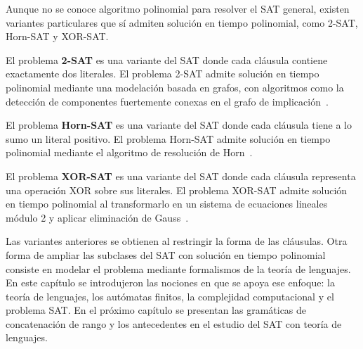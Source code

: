 Aunque no se conoce algoritmo polinomial para resolver el SAT general,
existen variantes particulares que sí admiten solución en tiempo polinomial,
como 2-SAT, Horn-SAT y XOR-SAT.

El problema \textbf{2-SAT} es una variante del SAT donde cada cláusula
contiene exactamente dos literales. El problema 2-SAT admite solución
en tiempo polinomial mediante una modelación basada en grafos, con
algoritmos como la detección de componentes fuertemente conexas en el
grafo de implicación~\cite{halim2013cp3}.

El problema \textbf{Horn-SAT} es una variante del SAT donde cada
cláusula tiene a lo sumo un literal positivo. El problema Horn-SAT
admite solución en tiempo polinomial mediante el algoritmo de
resolución de Horn~\cite{dowling1984horn}.

El problema \textbf{XOR-SAT} es una variante del SAT donde cada
cláusula representa una operación XOR sobre sus literales. El
problema XOR-SAT admite solución en tiempo polinomial al
transformarlo en un sistema de ecuaciones lineales módulo 2 y aplicar
eliminación de Gauss~\cite{schaefer1978}.

Las variantes anteriores se obtienen al restringir la forma de las
cláusulas. Otra forma de ampliar las subclases del SAT con solución en
tiempo polinomial consiste en modelar el problema mediante formalismos
de la teoría de lenguajes. En este capítulo se introdujeron las nociones
en que se apoya ese enfoque: la teoría de lenguajes, los autómatas
finitos, la complejidad computacional y el problema SAT. En el próximo capítulo
se presentan las gramáticas de concatenación de rango y los antecedentes
en el estudio del SAT con teoría de lenguajes.

